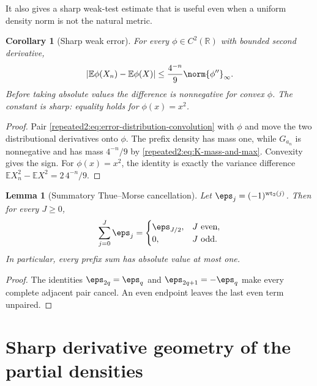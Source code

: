 \documentclass[11pt,oneside]{article}
\newtheorem{lemma}[lemma]{Lemma}
\newtheorem{corollary}[corollary]{Corollary}
\theoremstyle{definition}
\theoremstyle{remark}
\newcommand{\R}{\mathbb R}
\newcommand{\wt}{\operatorname{wt}_2}
\newcommand{\E}{\mathbb E}
\begin{document}
It also gives a sharp weak-test estimate that is useful even when a uniform density norm
is not the natural metric.

\begin{corollary}[Sharp weak error]
\label{repeated2:cor:weak-error}
For every $\phi\in C^2(\R)$ with bounded second derivative,
\begin{equation}
 \left|\E\phi(X_n)-\E\phi(X)\right|
 \le \frac{4^{-n}}9\norm{\phi''}_\infty.
 \label{repeated2:eq:weak-error}
\end{equation}
Before taking absolute values the difference is nonnegative for convex $\phi$.
The constant is sharp: equality holds for $\phi(x)=x^2$.
\end{corollary}

\begin{proof}
Pair \eqref{repeated2:eq:error-distribution-convolution} with $\phi$ and move the
two distributional derivatives onto $\phi$.  The prefix density has mass one, while
$G_{a_n}$ is nonnegative and has mass $4^{-n}/9$ by
\eqref{repeated2:eq:K-mass-and-max}.  Convexity gives the sign.  For $\phi(x)=x^2$,
the identity is exactly the variance difference
$\E X_n^2-\E X^2=2\,4^{-n}/9$.
\end{proof}

\begin{lemma}[Summatory Thue--Morse cancellation]
\label{repeated2:lem:TM-prefix}
Let $\eps_j=(-1)^{\wt(j)}$.  Then for every $J\ge0$,
\begin{equation}
 \sum_{j=0}^{J}\eps_j=
 \begin{cases}
  \eps_{J/2},&J\text{ even},\\
  0,&J\text{ odd}.
 \end{cases}                                                \label{repeated2:eq:TM-prefix}
\end{equation}
In particular, every prefix sum has absolute value at most one.
\end{lemma}

\begin{proof}
The identities $\eps_{2q}=\eps_q$ and $\eps_{2q+1}=-\eps_q$ make every complete adjacent pair
cancel.  An even endpoint leaves the last even term unpaired.
\end{proof}

\section{Sharp derivative geometry of the partial densities}
\label{repeated2:sec:partial-density-geometry}
\end{document}
